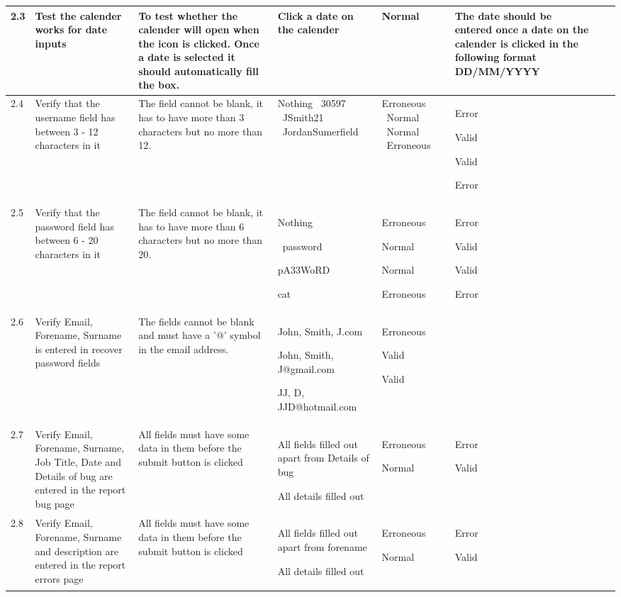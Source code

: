 \begin{landscape}
\begin{center}
\begin{longtable}{|p{1.5cm}|p{2.5cm}|p{2.5cm}|p{2cm}|p{2cm}|p{2cm}|p{2cm}|p{2cm}|}
2.3 & Test the calender works for date inputs & To test whether the calender will open when the icon is clicked. Once a date is selected it should automatically fill the box. & Click a date on the calender & Normal  & The date should be entered once a date on the calender is clicked in the following format DD/MM/YYYY && \\ \hline
2.4 & Verify that the username field has between 3 - 12 characters in it & The field cannot be blank, it has to have more than 3 characters but no more than 12. & Nothing \ 30597 \ JSmith21 \ JordanSumerfield &Erroneous \ Normal \ Normal \ Erroneous & Error         \par Valid              \par Valid                 \par Error && \\ \hline
2.5 & Verify that the password field has between 6 - 20 characters in it & The field cannot be blank, it has to have more than 6 characters but no more than 20. & Nothing \par\ password \par pA33WoRD \par cat  &Erroneous \par Normal \par Normal \par Erroneous & Error         \par Valid              \par Valid                 \par Error && \\ \hline
2.6 & Verify Email, Forename, Surname is entered in recover password fields & The fields cannot be blank and must have a '@' symbol in the email address. & John, Smith, J.com \par John, Smith, J@gmail.com \par JJ, D, JJD@hotmail.com \par & Erroneous \par Valid \par Valid \\ \hline
2.7 & Verify Email, Forename, Surname, Job Title, Date and Details of bug are entered in the report bug page & All fields must have some data in them before the submit  button is clicked & All fields filled out apart from Details of bug \par All details filled out & Erroneous \par Normal & Error \par Valid && \\ \hline
2.8 & Verify Email, Forename, Surname and description are entered in the report errors page & All fields must have some data in them before the submit  button is clicked & All fields filled out apart from forename \par All details filled out & Erroneous \par Normal & Error \par Valid && \\ \hline


\end{longtable}
\end{center}
\end{landscape}
